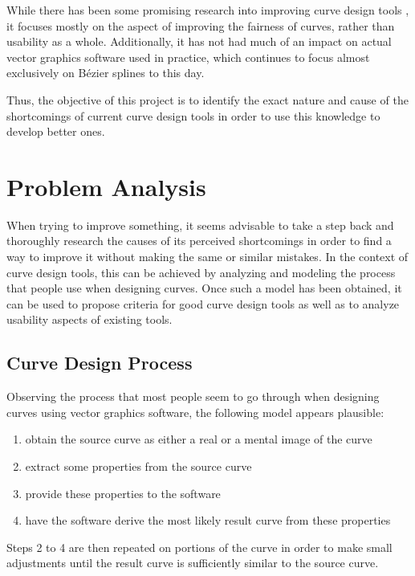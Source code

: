 \documentclass[a4paper]{article}
\begin{document}
		While there has been some promising research into improving curve design tools \cite{thesis-mvc} \cite{thesis-spiro}, it focuses mostly on the aspect of improving the fairness of curves, rather than usability as a whole. Additionally, it has not had much of an impact on actual vector graphics software used in practice, which continues to focus almost exclusively on Bézier splines to this day.

		Thus, the objective of this project is to identify the exact nature and cause of the shortcomings of current curve design tools in order to use this knowledge to develop better ones.

	\section{Problem Analysis}
	\label{section:problem_analysis}

		When trying to improve something, it seems advisable to take a step back and thoroughly research the causes of its perceived shortcomings in order to find a way to improve it without making the same or similar mistakes. In the context of curve design tools, this can be achieved by analyzing and modeling the process that people use when designing curves. Once such a model has been obtained, it can be used to propose criteria for good curve design tools as well as to analyze usability aspects of existing tools.

		\subsection{Curve Design Process}
		\label{section:curve_design_process}

			Observing the process that most people seem to go through when designing curves using vector graphics software, the following model appears plausible:
			\begin{enumerate}
				\item obtain the source curve as either a real or a mental image of the curve
				\item extract some properties from the source curve
				\item provide these properties to the software
				\item have the software derive the most likely result curve from these properties
			\end{enumerate}

			Steps 2 to 4 are then repeated on portions of the curve in order to make small adjustments until the result curve is sufficiently similar to the source curve.
\end{document}
